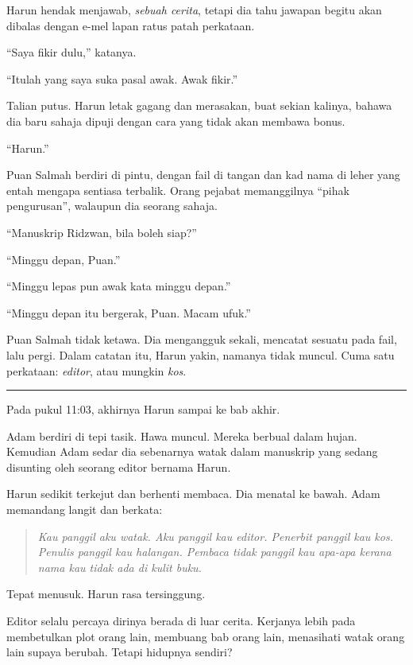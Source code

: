 \documentclass[
  11pt,
  a5paper,
  openany,
  oneside]{book}
\begin{document}
Harun hendak menjawab, \emph{sebuah cerita}, tetapi dia tahu jawapan
begitu akan dibalas dengan e-mel lapan ratus patah perkataan.

``Saya fikir dulu,'' katanya.

``Itulah yang saya suka pasal awak. Awak fikir.''

Talian putus. Harun letak gagang dan merasakan, buat sekian kalinya,
bahawa dia baru sahaja dipuji dengan cara yang tidak akan membawa bonus.

``Harun.''

Puan Salmah berdiri di pintu, dengan fail di tangan dan kad nama di
leher yang entah mengapa sentiasa terbalik. Orang pejabat memanggilnya
``pihak pengurusan'', walaupun dia seorang sahaja.

``Manuskrip Ridzwan, bila boleh siap?''

``Minggu depan, Puan.''

``Minggu lepas pun awak kata minggu depan.''

``Minggu depan itu bergerak, Puan. Macam ufuk.''

Puan Salmah tidak ketawa. Dia mengangguk sekali, mencatat sesuatu pada
fail, lalu pergi. Dalam catatan itu, Harun yakin, namanya tidak muncul.
Cuma satu perkataan: \emph{editor}, atau mungkin \emph{kos}.

\begin{center}\rule{0.5\linewidth}{0.5pt}\end{center}

Pada pukul 11:03, akhirnya Harun sampai ke bab akhir.

Adam berdiri di tepi tasik. Hawa muncul. Mereka berbual dalam hujan.
Kemudian Adam sedar dia sebenarnya watak dalam manuskrip yang sedang
disunting oleh seorang editor bernama Harun.

Harun sedikit terkejut dan berhenti membaca. Dia menatal ke bawah. Adam
memandang langit dan berkata:

\begin{quote}
\emph{Kau panggil aku watak. Aku panggil kau editor. Penerbit panggil
kau kos. Penulis panggil kau halangan. Pembaca tidak panggil kau apa-apa
kerana nama kau tidak ada di kulit buku.}
\end{quote}

Tepat menusuk. Harun rasa tersinggung.

Editor selalu percaya dirinya berada di luar cerita. Kerjanya lebih pada
membetulkan plot orang lain, membuang bab orang lain, menasihati watak
orang lain supaya berubah. Tetapi hidupnya sendiri?
\end{document}
